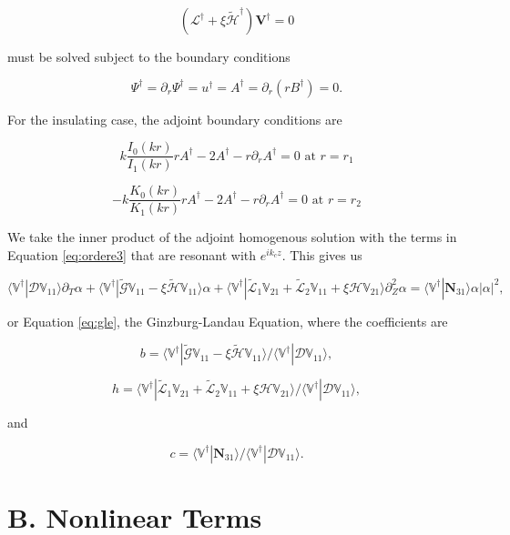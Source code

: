 \documentclass{emulateapj}
\newcommand{\beq}{\begin{equation}}
\newcommand{\eeq}{\end{equation}}
\begin{document}
\beq\label{eq:adjoint}
(\mathcal{L}^\dagger + \xi \widetilde{\mathcal{H}}^\dagger)\mathbf{V}^\dagger = 0
\eeq

must be solved subject to the boundary conditions

\beq
\Psi^\dagger = \partial_r \Psi^\dagger = u^\dagger = A^\dagger = \partial_r (r B^\dagger) = 0.
\eeq

For the insulating case, the adjoint boundary conditions are

\beq
k \frac{I_0 (k r)}{I_1 (k r)} r A^\dagger - 2 A^\dagger - r \partial_r A^\dagger = 0 \, \, \mathrm{at} \, \,   r = r_1
\eeq

\beq
- k \frac{K_0 (k r)}{K_1 (k r)} r A^\dagger - 2 A^\dagger - r \partial_r A^\dagger = 0 \, \, \mathrm{at} \, \,   r = r_2
\eeq

We take the inner product of the adjoint homogenous solution with the terms in Equation \ref{eq:ordere3} that are resonant with $e^{i k_c z}$. This gives us

\beq
\langle \mathbb{V}^\dagger | \mathcal{D} \mathbb{V}_{11} \rangle \partial_T \alpha + \langle  \mathbb{V}^\dagger | \widetilde{\mathcal{G}} \mathbb{V}_{11} - \xi \widetilde{\mathcal{H}} \mathbb{V}_{11} \rangle \alpha +  \langle \mathbb{V}^\dagger | \widetilde{\mathcal{L}}_1 \mathbb{V}_{21} + \widetilde{\mathcal{L}}_2 \mathbb{V}_{11} + \xi \mathcal{H} \mathbb{V}_{21} \rangle \partial_Z^2 \alpha = \langle \mathbb{V}^\dagger | \mathbf{N}_{31} \rangle \alpha |\alpha|^2,
\eeq

or Equation \ref{eq:gle}, the Ginzburg-Landau Equation, where the coefficients are 

\beq
b = \langle  \mathbb{V}^\dagger | \widetilde{\mathcal{G}} \mathbb{V}_{11} - \xi \widetilde{\mathcal{H}} \mathbb{V}_{11} \rangle / \langle \mathbb{V}^\dagger | \mathcal{D} \mathbb{V}_{11} \rangle,
\eeq

\beq
h = \langle \mathbb{V}^\dagger | \widetilde{\mathcal{L}}_1 \mathbb{V}_{21} + \widetilde{\mathcal{L}}_2 \mathbb{V}_{11} + \xi \mathcal{H} \mathbb{V}_{21} \rangle / \langle \mathbb{V}^\dagger | \mathcal{D} \mathbb{V}_{11} \rangle,
\eeq

and

\beq
c = \langle \mathbb{V}^\dagger | \mathbf{N}_{31} \rangle / \langle \mathbb{V}^\dagger | \mathcal{D} \mathbb{V}_{11} \rangle. 
\eeq

\section{B. Nonlinear Terms}\label{app:nonlinear_terms}
\end{document}
